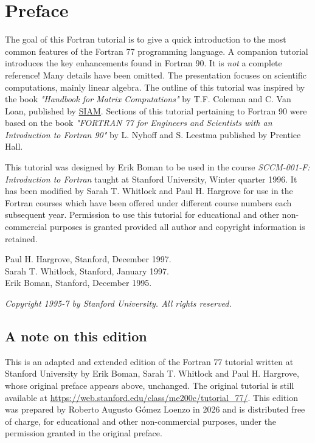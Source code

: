 \chapter{Preface}

The goal of this Fortran tutorial is to give a quick introduction to the most common features of the Fortran 77 programming language. A companion tutorial introduces the key enhancements found in Fortran 90. It is \emph{not} a complete reference! Many details have been omitted. The presentation focuses on scientific computations, mainly linear algebra. The outline of this tutorial was inspired by the book \emph{"Handbook for Matrix Computations"} by T.F. Coleman and C. Van Loan, published by \href{http://www.siam.org/}{SIAM}. Sections of this tutorial pertaining to Fortran 90 were based on the book \emph{"FORTRAN 77 for Engineers and Scientists with an Introduction to Fortran 90"} by L. Nyhoff and S. Leestma published by Prentice Hall.

This tutorial was designed by Erik Boman to be used in the course \emph{SCCM-001-F: Introduction to Fortran} taught at Stanford University, Winter quarter 1996. It has been modified by Sarah T. Whitlock and Paul H. Hargrove for use in the Fortran courses which have been offered under different course numbers each subsequent year. Permission to use this tutorial for educational and other non-commercial purposes is granted provided all author and copyright information is retained.

\begin{description}
    \item[Paul H. Hargrove, Stanford, December 1997.]
    \item[Sarah T. Whitlock, Stanford, January 1997.]
    \item[Erik Boman, Stanford, December 1995.]
\end{description}

\emph{Copyright \textcopyright{} 1995-7 by Stanford University. All rights reserved.}

\section*{A note on this edition}

This is an adapted and extended edition of the Fortran 77 tutorial written at Stanford University by Erik Boman, Sarah T. Whitlock and Paul H. Hargrove, whose original preface appears above, unchanged. The original tutorial is still available at \url{https://web.stanford.edu/class/me200c/tutorial_77/}. This edition was prepared by Roberto Augusto G\'omez Loenzo in 2026 and is distributed free of charge, for educational and other non-commercial purposes, under the permission granted in the original preface.

